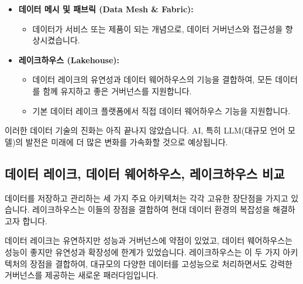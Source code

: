\documentclass[11pt,a4paper]{article}
\begin{document}
\begin{itemize}
\begin{itemize}
        \item 그러나 적절한 거버넌스 없이는 쉽게 데이터 스웜프(Data Swamp)로 변질될 수 있었습니다.
    \end{itemize}
    \item \textbf{데이터 메시 및 패브릭 (Data Mesh & Fabric):}
    \begin{itemize}
        \item 데이터가 서비스 또는 제품이 되는 개념으로, 데이터 거버넌스와 접근성을 향상시켰습니다.
    \end{itemize}
    \item \textbf{레이크하우스 (Lakehouse):}
    \begin{itemize}
        \item 데이터 레이크의 유연성과 데이터 웨어하우스의 기능을 결합하여, 모든 데이터를 함께 유지하고 좋은 거버넌스를 지원합니다.
        \item 기본 데이터 레이크 플랫폼에서 직접 데이터 웨어하우스 기능을 지원합니다.
    \end{itemize}
\end{itemize}

\begin{tcolorbox}[mywarning={지속적인 진화}]
이러한 데이터 기술의 진화는 아직 끝나지 않았습니다. AI, 특히 LLM(대규모 언어 모델)의 발전은 미래에 더 많은 변화를 가속화할 것으로 예상됩니다.
\end{tcolorbox}

\subsection{데이터 레이크, 데이터 웨어하우스, 레이크하우스 비교}
데이터를 저장하고 관리하는 세 가지 주요 아키텍처는 각각 고유한 장단점을 가지고 있습니다. 레이크하우스는 이들의 장점을 결합하여 현대 데이터 환경의 복잡성을 해결하고자 합니다.

\begin{tcolorbox}[mybox={핵심 요약: 레이크하우스의 등장 배경}]
데이터 레이크는 유연하지만 성능과 거버넌스에 약점이 있었고, 데이터 웨어하우스는 성능이 좋지만 유연성과 확장성에 한계가 있었습니다. 레이크하우스는 이 두 가지 아키텍처의 장점을 결합하여, 대규모의 다양한 데이터를 고성능으로 처리하면서도 강력한 거버넌스를 제공하는 새로운 패러다임입니다.
\end{tcolorbox}
\end{document}
